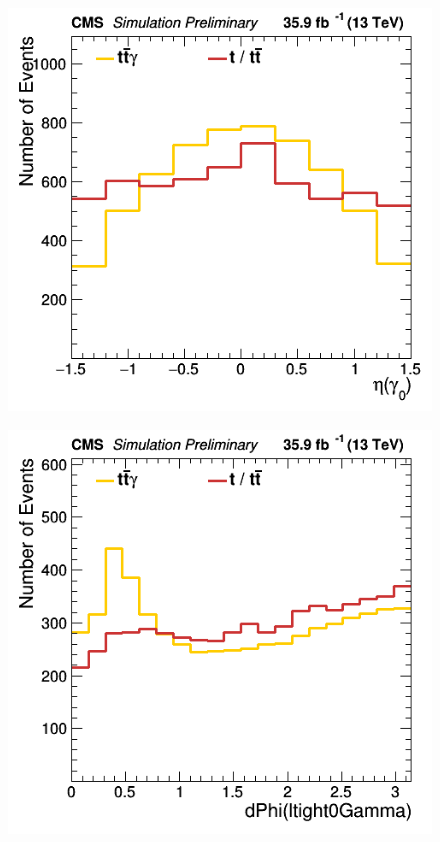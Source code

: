 \documentclass[11pt]{scrartcl}
\begin{document}
	\begin{figure}[H]
	\centering
	\begin{minipage}{.5\textwidth}
	  \centering
	  \includegraphics[width=0.75\linewidth]{figures/Select3/PhotonGood0_eta.png}
	  \label{fig:PhotonGood0eta}
	\end{minipage}%
	\begin{minipage}{.5\textwidth}
	  \centering
	  \includegraphics[width=0.75\linewidth]{figures/Select3/ltight0GammadPhi.png}
	  \label{fig:ltight0GammadPhi}
	\end{minipage}
	\end{figure}
	
\end{document}
